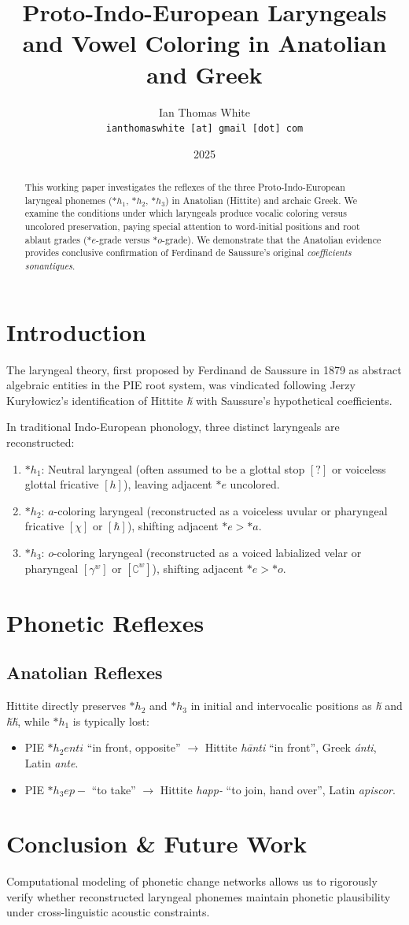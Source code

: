 \documentclass[11pt,article]{article}
\title{\textbf{Proto-Indo-European Laryngeals and Vowel Coloring in Anatolian and Greek}}
\author{Ian Thomas White \\ \texttt{ianthomaswhite\,[at]\,gmail\,[dot]\,com}}
\date{2025}
\begin{document}
\maketitle

\begin{abstract}
This working paper investigates the reflexes of the three Proto-Indo-European laryngeal phonemes ($*h_1$, $*h_2$, $*h_3$) in Anatolian (Hittite) and archaic Greek. We examine the conditions under which laryngeals produce vocalic coloring versus uncolored preservation, paying special attention to word-initial positions and root ablaut grades ($*e$-grade versus $*o$-grade). We demonstrate that the Anatolian evidence provides conclusive confirmation of Ferdinand de Saussure's original \textit{coefficients sonantiques}.
\end{abstract}

\section{Introduction}

The laryngeal theory, first proposed by Ferdinand de Saussure in 1879 as abstract algebraic entities in the PIE root system, was vindicated following Jerzy Kury\l{}owicz's identification of Hittite \textit{\u{h}} with Saussure's hypothetical coefficients.

In traditional Indo-European phonology, three distinct laryngeals are reconstructed:
\begin{enumerate}
    \item $*h_1$: Neutral laryngeal (often assumed to be a glottal stop $[?]$ or voiceless glottal fricative $[h]$), leaving adjacent $*e$ uncolored.
    \item $*h_2$: $a$-coloring laryngeal (reconstructed as a voiceless uvular or pharyngeal fricative $[\chi]$ or $[\hbar]$), shifting adjacent $*e > *a$.
    \item $*h_3$: $o$-coloring laryngeal (reconstructed as a voiced labialized velar or pharyngeal $[\gamma^w]$ or $[\complement^w]$), shifting adjacent $*e > *o$.
\end{enumerate}

\section{Phonetic Reflexes}

\subsection{Anatolian Reflexes}
Hittite directly preserves $*h_2$ and $*h_3$ in initial and intervocalic positions as \textit{\u{h}} and \textit{\u{h}\u{h}}, while $*h_1$ is typically lost:
\begin{itemize}
    \item PIE $*h_2enti$ ``in front, opposite'' $\to$ Hittite \textit{h\={a}nti} ``in front'', Greek \textit{\'{a}nti}, Latin \textit{ante}.
    \item PIE $*h_3ep-$ ``to take'' $\to$ Hittite \textit{happ-} ``to join, hand over'', Latin \textit{apiscor}.
\end{itemize}

\section{Conclusion \& Future Work}
Computational modeling of phonetic change networks allows us to rigorously verify whether reconstructed laryngeal phonemes maintain phonetic plausibility under cross-linguistic acoustic constraints.
\end{document}
